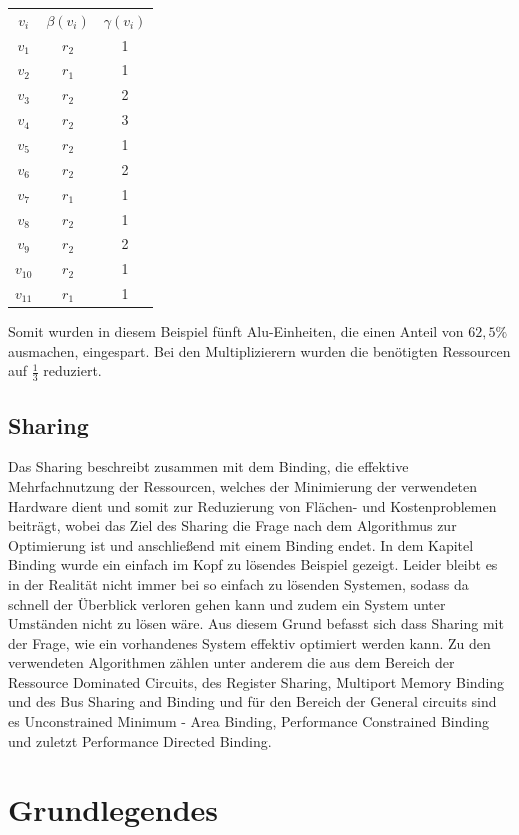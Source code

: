 \documentclass[conference]{IEEEtran}
\begin{document}
\begin{center}
\begin{tabular}[h]{ccc}
$v_i$&$\beta(v_i)$&$\gamma(v_i)$\\
$v_1$&$r_2$&1\\
$v_2$&$r_1$&1\\
$v_3$&$r_2$&2\\
$v_4$&$r_2$&3\\
$v_5$&$r_2$&1\\
$v_6$&$r_2$&2\\
$v_7$&$r_1$&1\\
$v_8$&$r_2$&1\\
$v_9$&$r_2$&2\\
$v_10$&$r_2$&1\\
$v_11$&$r_1$&1\\
\end{tabular}
\end{center}
Somit wurden in diesem Beispiel fünft Alu-Einheiten, die einen Anteil von $62,5\%$ ausmachen, eingespart. Bei den Multiplizierern wurden die benötigten Ressourcen auf $\frac{1}{3}$ reduziert.


\subsection{Sharing}
Das Sharing beschreibt zusammen mit dem Binding,  die effektive Mehrfachnutzung der Ressourcen, welches der Minimierung der verwendeten Hardware dient und somit zur Reduzierung von Flächen- und Kostenproblemen beiträgt, wobei das Ziel des Sharing die Frage nach dem Algorithmus zur Optimierung ist und anschließend mit einem Binding endet. In dem Kapitel Binding wurde ein einfach im Kopf zu lösendes Beispiel gezeigt. Leider bleibt es in der Realität nicht immer bei so einfach zu lösenden Systemen, sodass da schnell der Überblick verloren gehen kann und zudem ein System unter Umständen nicht zu lösen wäre. Aus diesem Grund befasst sich dass Sharing mit der Frage, wie ein vorhandenes System effektiv optimiert werden kann. Zu den verwendeten Algorithmen zählen unter anderem die aus dem Bereich der Ressource Dominated Circuits, des Register Sharing, Multiport Memory Binding und des Bus Sharing and Binding und für den Bereich der General circuits sind es Unconstrained Minimum - Area Binding, Performance Constrained Binding und zuletzt Performance Directed Binding.   
\section{Grundlegendes}
\end{document}

